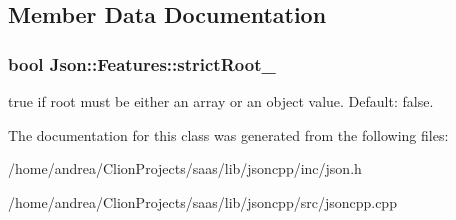 \subsection{Member Data Documentation}
\subsubsection[{\texorpdfstring{strict\+Root\+\_\+}{strictRoot_}}]{\setlength{\rightskip}{0pt plus 5cm}bool Json\+::\+Features\+::strict\+Root\+\_\+}\hypertarget{class_json_1_1_features_a1162c37a1458adc32582b585b552f9c3}{}\label{class_json_1_1_features_a1162c37a1458adc32582b585b552f9c3}
{\ttfamily true} if root must be either an array or an object value. Default\+: {\ttfamily false}. 

The documentation for this class was generated from the following files\+:\begin{DoxyCompactItemize}
\item 
/home/andrea/\+Clion\+Projects/saas/lib/jsoncpp/inc/json.\+h\item 
/home/andrea/\+Clion\+Projects/saas/lib/jsoncpp/src/jsoncpp.\+cpp\end{DoxyCompactItemize}

